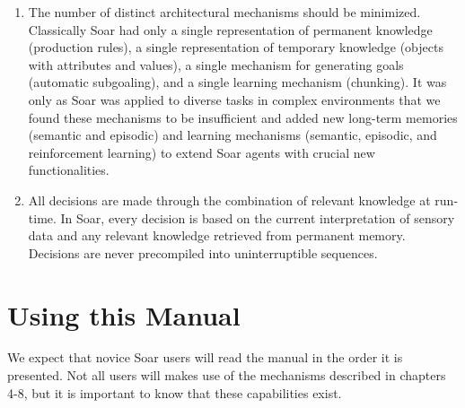 \begin{enumerate} 
\item The number of distinct architectural mechanisms should be minimized.
        Classically Soar had only a single representation of permanent knowledge
        (production rules), a single representation of temporary knowledge (objects
        with attributes and values), a single mechanism for generating goals
        (automatic subgoaling), and a single learning mechanism (chunking).
        It was only as Soar was applied to diverse tasks in complex environments that 
        we found these mechanisms to be insufficient and added new 
        long-term memories (semantic and episodic) and learning mechanisms
        (semantic, episodic, and reinforcement learning) to extend Soar agents
        with crucial new functionalities.
\vspace{-6pt}

\item All decisions are made through the combination of relevant knowledge at
        run-time.  In Soar, every decision is based on the current
        interpretation of sensory data and any relevant knowledge retrieved
        from permanent memory.  Decisions are never precompiled into
        uninterruptible sequences.
\end{enumerate}


\section{Using this Manual}


We expect that novice Soar users will read the manual in the order it is
presented. Not all users will makes use of the mechanisms described in chapters 4-8,
but it is important to know that these capabilities exist.

